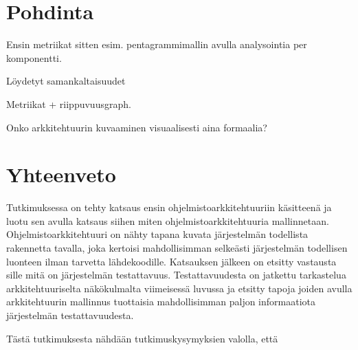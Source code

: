 \documentclass[finnish]{tktltiki2}
\numberwithin{table}{section}
\theoremstyle{definition}
\theoremstyle{remark}
\begin{document}
\newpage



\section{Pohdinta} \label{pondering}

Ensin metriikat sitten esim. pentagrammimallin avulla analysointia per komponentti.

Löydetyt samankaltaisuudet

Metriikat + riippuvuusgraph.

Onko arkkitehtuurin kuvaaminen visuaalisesti aina formaalia?


\newpage

\section{Yhteenveto}

Tutkimuksessa on tehty katsaus ensin ohjelmistoarkkitehtuuriin käsitteenä ja luotu sen avulla katsaus siihen miten ohjelmistoarkkitehtuuria mallinnetaan. Ohjelmistoarkkitehtuuri on nähty tapana kuvata järjestelmän todellista rakennetta tavalla, joka kertoisi mahdollisimman selkeästi järjestelmän todellisen luonteen ilman tarvetta lähdekoodille. Katsauksen jälkeen on etsitty vastausta sille mitä on järjestelmän testattavuus. Testattavuudesta on jatkettu tarkastelua arkkitehtuuriselta näkökulmalta viimeisessä luvussa ja etsitty tapoja joiden avulla arkkitehtuurin mallinnus tuottaisia mahdollisimman paljon informaatiota järjestelmän testattavuudesta.

Tästä tutkimuksesta nähdään tutkimuskysymyksien valolla, että

\newpage



%
%
% 
%

%






% 
\end{document}
